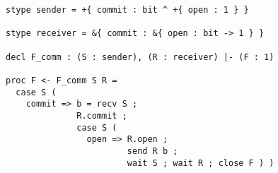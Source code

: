 \begin{lstlisting}[basicstyle=\small\ttfamily,frame=single]
stype sender = +{ commit : bit ^ +{ open : 1 } } 

stype receiver = &{ commit : &{ open : bit -> 1 } }

decl F_comm : (S : sender), (R : receiver) |- (F : 1)

proc F <- F_comm S R =
  case S (
    commit => b = recv S ;
              R.commit ;
              case S (
                open => R.open ;
                        send R b ;
                        wait S ; wait R ; close F ) )
\end{lstlisting}
